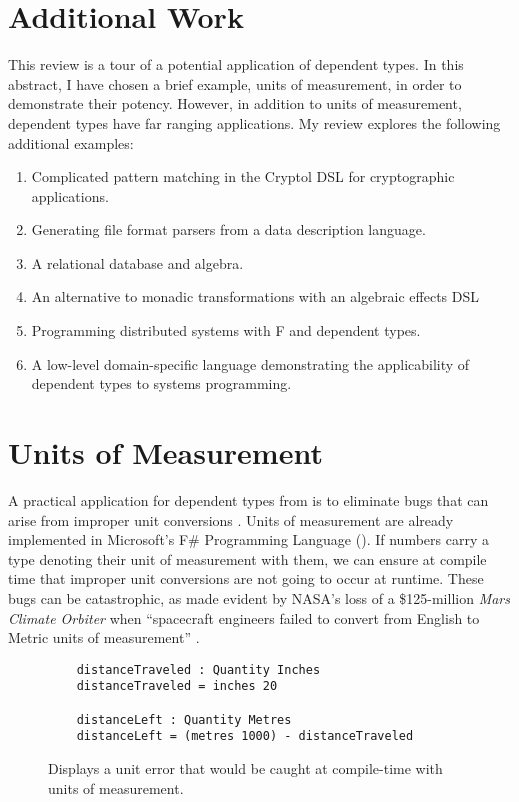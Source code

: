 \section{Additional Work}
This review is a  tour of a potential application of dependent types. In this
abstract, I have chosen a brief example, units of measurement, in order to
demonstrate their potency. However, in addition to units of measurement,
dependent types have far ranging applications. My review explores the following
additional examples: 
\begin{enumerate}
  \item Complicated pattern matching in the Cryptol DSL for cryptographic
  applications. \cite{power_of_pi}
  \item Generating file format parsers from a data description language.
  \cite{power_of_pi}
  \item A relational database and algebra. \cite{power_of_pi, eisenberg2016}
  \item An alternative to monadic transformations with an algebraic effects DSL
  \cite{algebraic}
  \item Programming distributed systems with F\* and dependent types.
  \cite{fstar_distributed_programming}
  \item A low-level domain-specific language demonstrating the applicability of
  dependent types to systems programming. \cite{idris_systems_programming}
\end{enumerate}

\section{Units of Measurement}
A practical application for dependent types from is to eliminate bugs that can
arise from improper unit conversions \cite{gundry2013}. Units of measurement are
already implemented in Microsoft's F\# Programming Language
(\cite{kennedy2009}). If numbers carry a type denoting their unit of measurement
with them, we can ensure at compile time that improper unit conversions are not
going to occur at runtime. These bugs can be catastrophic, as made evident by
NASA's loss of a \$125-million \textit{Mars Climate Orbiter} when ``spacecraft
engineers failed to convert from English to Metric units of measurement''
\cite{hotz1999}. 

\begin{figure}[ht!]
  \caption{Displays a unit error that would be caught at compile-time with units of measurement.}
  \label{unit_error}
  \begin{lstlisting}
    distanceTraveled : Quantity Inches
    distanceTraveled = inches 20

    distanceLeft : Quantity Metres
    distanceLeft = (metres 1000) - distanceTraveled
  \end{lstlisting}
\end{figure}

